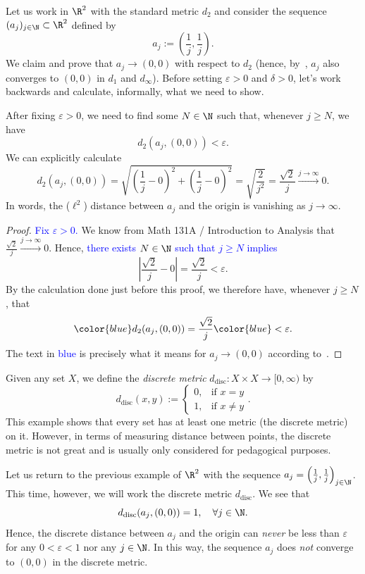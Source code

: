 \begin{eg}
	\label{eg_diag_vanish}
	Let us work in $\R^2$ with the standard metric $d_2$ and consider the sequence $(a_j)_{j\in\N}\subset \R^2$ defined by
	\[
	a_j := \left(\frac{1}{j},\frac{1}{j}\right).
	\]
	We claim and prove that $a_j\to (0,0)$ with respect to $d_2$ (hence, by~, $a_j$ also converges to $(0,0)$ in $d_1$ and $d_\infty$). Before setting $\varepsilon>0$ and $\delta>0$, let's work backwards and calculate, informally, what we need to show.
	
	After fixing $\varepsilon>0$, we need to find some $N\in\N$ such that, whenever $j\ge N$, we have
	\[
	d_2(a_j,(0,0))<\varepsilon.
	\]
	We can explicitly calculate
	\[
	d_2(a_j,(0,0)) = \sqrt{\left(\frac{1}{j} - 0\right)^2 + \left(\frac{1}{j} - 0\right)^2} = \sqrt{\frac{2}{j^2}} = \frac{\sqrt{2}}{j}\overset{j\to \infty}{\to}0.
	\]
	In words, the ($\ell^2$) distance between $a_j$ and the origin is vanishing as $j\to \infty$.
	\begin{proof}
		\textcolor{blue}{Fix $\varepsilon>0$.} We know from Math 131A / Introduction to Analysis that $\frac{\sqrt{2}}{j}\overset{j\to \infty}{\to} 0$. Hence, \textcolor{blue}{there exists $N\in\N$ such that $j\ge N$ implies}
		\[
		\left|\frac{\sqrt{2}}{j} - 0\right| = \frac{\sqrt{2}}{j} < \varepsilon.
		\]
		By the calculation done just before this proof, we therefore have, whenever $j\ge N$, that
		\[
		{\color{blue}d_2(a_j,(0,0))} = \frac{\sqrt{2}}{j} {\color{blue}<\varepsilon.}
		\]
		The text in \textcolor{blue}{blue} is precisely what it means for $a_j\to (0,0)$ according to~.
	\end{proof}
\end{eg}
\begin{eg}
\label{eg:disc_metric}
Given any set $X$, we define the \textit{discrete metric} $d_\text{disc}:X\times X \to [0,\infty)$ by
\[
d_\text{disc}(x,y) := \left\{
\begin{array}{cl}
	0, 	&\text{if }x=y 	\\
	1, 	&\text{if }x\neq y
\end{array}
\right..
\]
This example shows that every set has at least one metric (the discrete metric) on it. However, in terms of measuring distance between points, the discrete metric is not great and is usually only considered for pedagogical purposes.

Let us return to the previous example of $\R^2$ with the sequence $a_j = \left(\frac{1}{j},\frac{1}{j}\right)_{j\in\N}$. This time, however, we will work the discrete metric $d_\text{disc}$. We see that
\[
d_\text{disc}(a_j,(0,0)) = 1,\quad \forall j\in\N.
\]
Hence, the discrete distance between $a_j$ and the origin can \textit{never} be less than $\varepsilon$ for any $0<\varepsilon<1$ nor any $j\in\N$. In this way, the sequence $a_j$ does \textit{not} converge to $(0,0)$ in the discrete metric.
\end{eg}
